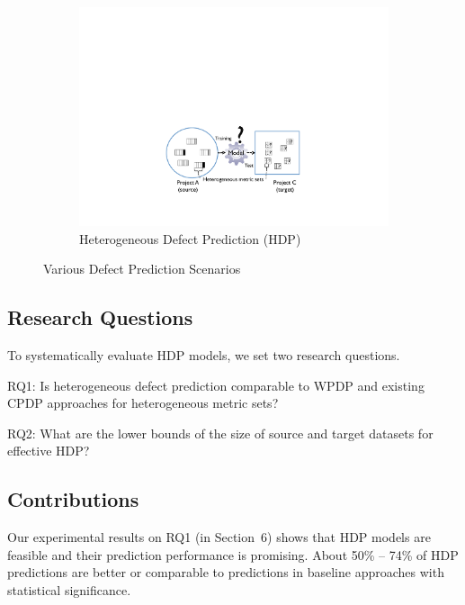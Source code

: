 \begin{figure}[t]
 \begin{subfigure}{0.8\linewidth}
 	\includegraphics[scale=0.5]{Figures/intro/p_crossdomain.pdf}
  	\caption{Heterogeneous Defect Prediction \tiny{(HDP)}}
   	\label{fig:subfig3}
 \end{subfigure}
 
 \label{fig:type_of_predictions}
 \caption{%
  Various Defect Prediction Scenarios
  }
\end{figure}

\subsection{Research Questions}
To systematically evaluate HDP models, we set
two research questions.
\squishlist
  \item RQ1: Is heterogeneous defect prediction comparable to WPDP and existing CPDP approaches for heterogeneous metric sets?
   \item RQ2: What are the  lower  bounds  of  the  size  of source and target  datasets  for  effective HDP?
\squishend
% 

\subsection{Contributions}
Our experimental results on RQ1 (in Section~6) shows that HDP models are feasible and their prediction
performance is promising. About 50\% -- 74\% of HDP predictions
are better or comparable to predictions in baseline approaches with statistical
significance.
 
